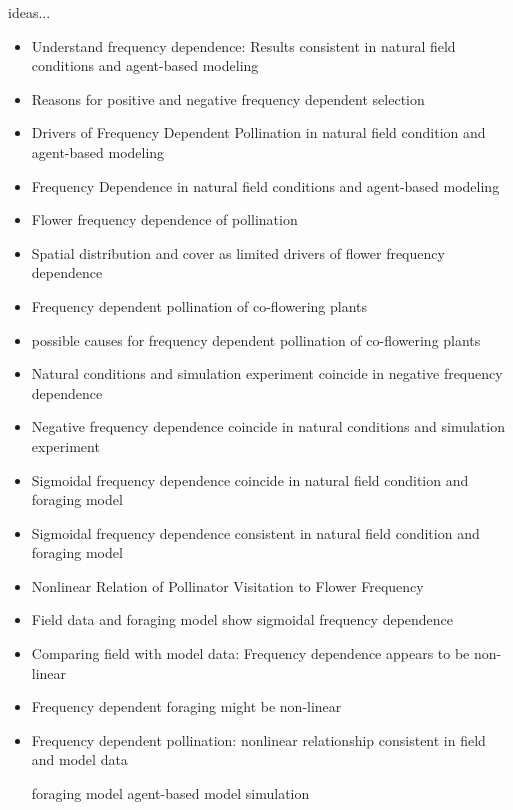 \documentclass{article}
\begin{document}
ideas...
\begin{itemize}

\item Understand frequency dependence: Results consistent in natural field conditions and agent-based modeling

\item  Reasons for positive and negative frequency dependent selection

\item Drivers of Frequency Dependent Pollination in natural field condition and agent-based modeling

\item Frequency Dependence in natural field conditions and agent-based modeling

\item  Flower frequency dependence of pollination

\item Spatial distribution and cover as limited drivers of flower frequency dependence

\item  Frequency dependent pollination of co-flowering plants 

\item  possible causes for frequency dependent pollination of co-flowering plants 

\item  Natural conditions and simulation experiment coincide in negative frequency dependence

\item  Negative frequency dependence coincide in natural conditions and simulation experiment

\item  Sigmoidal frequency dependence coincide in natural field condition and foraging model

\item  Sigmoidal frequency dependence consistent in natural field condition and foraging model

\item  Nonlinear Relation of Pollinator Visitation to Flower Frequency

\item  Field data and foraging model show sigmoidal frequency dependence

\item  Comparing field with model data: Frequency dependence appears to be non-linear 

\item  Frequency dependent foraging might be non-linear 

\item  Frequency dependent pollination: nonlinear relationship consistent in field and model data



foraging model
agent-based model
simulation


\end{itemize}
\end{document}

